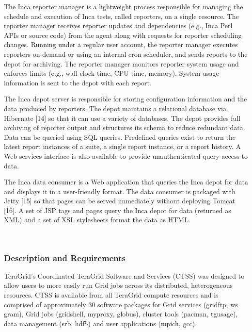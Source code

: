 \documentclass[times,10pt,twocolumn]{article}
\begin{document}

The Inca reporter manager is a lightweight process responsible for managing
the schedule and execution of Inca tests, called reporters, on a single
resource. The reporter manager receives reporter updates and dependencies
(e.g., Inca Perl APIs or source code) from the agent along with requests for
reporter scheduling changes.  Running under a regular user account, the
reporter manager executes reporters on-demand or using an internal cron
scheduler, and sends reports to the depot for archiving. The reporter
manager monitors reporter system usage and enforces limits (e.g., wall clock
time, CPU time, memory).  System usage information is sent to the depot with
each report. 




The Inca depot server is responsible for storing configuration information
and the data produced by reporters. The depot maintains a relational
database via Hibernate [14] so that it can use a variety of databases.  The
depot provides full archiving of reporter output and structures its schema
to reduce redundant data.  Data can be queried using SQL queries. Predefined
queries exist to return the latest report instances of a suite, a single
report instance, or a report history.  A Web services interface is also
available to provide unauthenticated query access to data.  



The Inca data consumer is a Web application that queries the Inca depot for
data and displays it in a user-friendly format.  The data consumer is
packaged with Jetty [15] so that pages can be served immediately without
deploying Tomcat [16].  A set of JSP tags and pages query the Inca depot for
data (returned as XML) and a set of XSL stylesheets format the data as HTML.

~\newpage
~\newpage
~\newpage
~\newpage

\label{usecases}


\subsubsection{Description and Requirements}


TeraGrid's Coordinated TeraGrid Software and Services (CTSS) was designed to
allow users to more easily run Grid jobs across its distributed, heterogeneous
resources.  CTSS is available from all TeraGrid compute resources and is
comprised of approximately 30 software packages for Grid services (gridftp, ws
gram), Grid jobs (gridshell, myproxy, globus), cluster tools (pacman, tgusage),
data management (srb, hdf5) and user applications (mpich, gcc).
\end{document}
